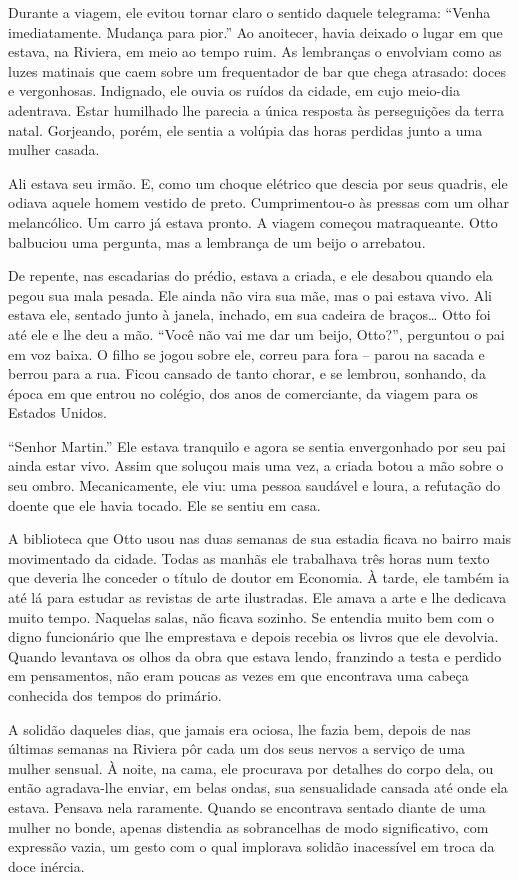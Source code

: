 Durante a viagem, ele evitou tornar claro o sentido daquele telegrama:
``Venha imediatamente. Mudança para pior.'' Ao anoitecer, havia deixado
o lugar em que estava, na Riviera, em meio ao tempo ruim. As lembranças
o envolviam como as luzes matinais que caem sobre um frequentador de bar
que chega atrasado: doces e vergonhosas. Indignado, ele ouvia os ruídos
da cidade, em cujo meio-dia adentrava. Estar humilhado lhe parecia a
única resposta às perseguições da terra natal. Gorjeando, porém, ele
sentia a volúpia das horas perdidas junto a uma mulher casada.

Ali estava seu irmão. E, como um choque elétrico que descia por seus
quadris, ele odiava aquele homem vestido de preto. Cumprimentou-o às
pressas com um olhar melancólico. Um carro já estava pronto. A viagem
começou matraqueante. Otto balbuciou uma pergunta, mas a lembrança de um
beijo o arrebatou.

De repente, nas escadarias do prédio, estava a criada, e ele desabou
quando ela pegou sua mala pesada. Ele ainda não vira sua mãe, mas o pai
estava vivo. Ali estava ele, sentado junto à janela, inchado, em sua
cadeira de braços\ldots{} Otto foi até ele e lhe deu a mão. ``Você não vai me
dar um beijo, Otto?'', perguntou o pai em voz baixa. O filho se jogou
sobre ele, correu para fora -- parou na sacada e berrou para a rua.
Ficou cansado de tanto chorar, e se lembrou, sonhando, da época em que
entrou no colégio, dos anos de comerciante, da viagem para os Estados
Unidos.

``Senhor Martin.'' Ele estava tranquilo e agora se sentia envergonhado
por seu pai ainda estar vivo. Assim que soluçou mais uma vez, a criada
botou a mão sobre o seu ombro. Mecanicamente, ele viu: uma pessoa
saudável e loura, a refutação do doente que ele havia tocado. Ele se
sentiu em casa.

A biblioteca que Otto usou nas duas semanas de sua estadia ficava no
bairro mais movimentado da cidade. Todas as manhãs ele trabalhava três
horas num texto que deveria lhe conceder o título de doutor em Economia.
À tarde, ele também ia até lá para estudar as revistas de arte
ilustradas. Ele amava a arte e lhe dedicava muito tempo. Naquelas salas,
não ficava sozinho. Se entendia muito bem com o digno funcionário que
lhe emprestava e depois recebia os livros que ele devolvia. Quando
levantava os olhos da obra que estava lendo, franzindo a testa e perdido
em pensamentos, não eram poucas as vezes em que encontrava uma cabeça
conhecida dos tempos do primário.

A solidão daqueles dias, que jamais era ociosa, lhe fazia bem, depois de
nas últimas semanas na Riviera pôr cada um dos seus nervos a serviço de
uma mulher sensual. À noite, na cama, ele procurava por detalhes do
corpo dela, ou então agradava-lhe enviar, em belas ondas, sua
sensualidade cansada até onde ela estava. Pensava nela raramente. Quando
se encontrava sentado diante de uma mulher no bonde, apenas distendia as
sobrancelhas de modo significativo, com expressão vazia, um gesto com o
qual implorava solidão inacessível em troca da doce inércia.

